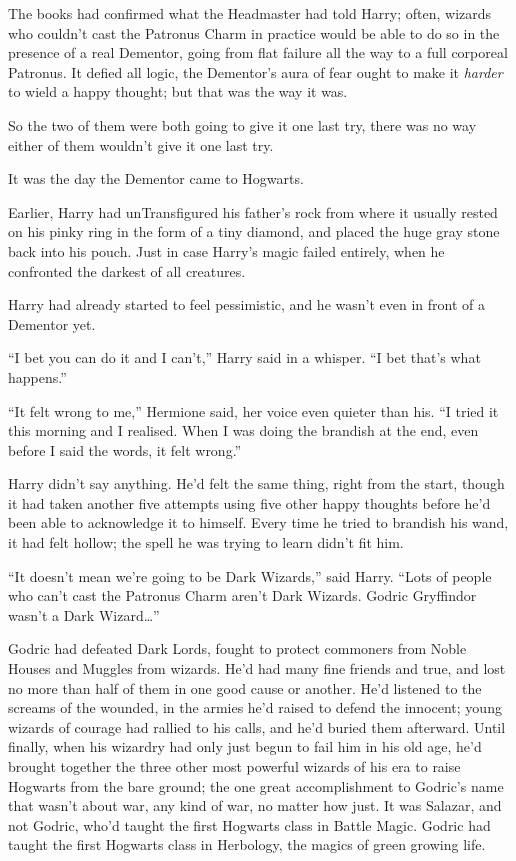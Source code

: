 The books had confirmed what the Headmaster had told Harry; often,
wizards who couldn't cast the Patronus Charm in practice would be able
to do so in the presence of a real Dementor, going from flat failure all
the way to a full corporeal Patronus. It defied all logic, the
Dementor's aura of fear ought to make it \emph{harder} to wield a happy
thought; but that was the way it was.

So the two of them were both going to give it one last try, there was no
way either of them wouldn't give it one last try.

It was the day the Dementor came to Hogwarts.

Earlier, Harry had unTransfigured his father's rock from where it
usually rested on his pinky ring in the form of a tiny diamond, and
placed the huge gray stone back into his pouch. Just in case Harry's
magic failed entirely, when he confronted the darkest of all creatures.

Harry had already started to feel pessimistic, and he wasn't even in
front of a Dementor yet.

``I bet you can do it and I can't,'' Harry said in a whisper. ``I bet
that's what happens.''

``It felt wrong to me,'' Hermione said, her voice even quieter than his.
``I tried it this morning and I realised. When I was doing the brandish
at the end, even before I said the words, it felt wrong.''

Harry didn't say anything. He'd felt the same thing, right from the
start, though it had taken another five attempts using five other happy
thoughts before he'd been able to acknowledge it to himself. Every time
he tried to brandish his wand, it had felt hollow; the spell he was
trying to learn didn't fit him.

``It doesn't mean we're going to be Dark Wizards,'' said Harry. ``Lots
of people who can't cast the Patronus Charm aren't Dark Wizards. Godric
Gryffindor wasn't a Dark Wizard\ldots{}''

Godric had defeated Dark Lords, fought to protect commoners from Noble
Houses and Muggles from wizards. He'd had many fine friends and true,
and lost no more than half of them in one good cause or another. He'd
listened to the screams of the wounded, in the armies he'd raised to
defend the innocent; young wizards of courage had rallied to his calls,
and he'd buried them afterward. Until finally, when his wizardry had
only just begun to fail him in his old age, he'd brought together the
three other most powerful wizards of his era to raise Hogwarts from the
bare ground; the one great accomplishment to Godric's name that wasn't
about war, any kind of war, no matter how just. It was Salazar, and not
Godric, who'd taught the first Hogwarts class in Battle Magic. Godric
had taught the first Hogwarts class in Herbology, the magics of green
growing life.

